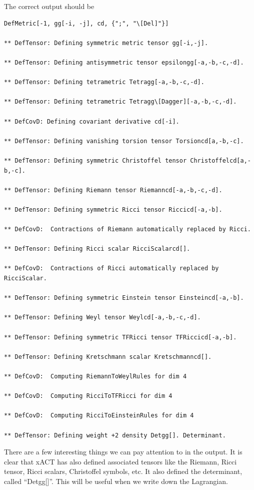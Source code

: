 \documentclass{book}
\theoremstyle{definition}
\begin{document}
The correct output should be
\begin{lstlisting}
DefMetric[-1, gg[-i, -j], cd, {";", "\[Del]"}]

** DefTensor: Defining symmetric metric tensor gg[-i,-j]. 

** DefTensor: Defining antisymmetric tensor epsilongg[-a,-b,-c,-d]. 

** DefTensor: Defining tetrametric Tetragg[-a,-b,-c,-d]. 

** DefTensor: Defining tetrametric Tetragg\[Dagger][-a,-b,-c,-d]. 

** DefCovD: Defining covariant derivative cd[-i]. 

** DefTensor: Defining vanishing torsion tensor Torsioncd[a,-b,-c]. 

** DefTensor: Defining symmetric Christoffel tensor Christoffelcd[a,-b,-c]. 

** DefTensor: Defining Riemann tensor Riemanncd[-a,-b,-c,-d]. 

** DefTensor: Defining symmetric Ricci tensor Riccicd[-a,-b]. 

** DefCovD:  Contractions of Riemann automatically replaced by Ricci.

** DefTensor: Defining Ricci scalar RicciScalarcd[]. 

** DefCovD:  Contractions of Ricci automatically replaced by RicciScalar.

** DefTensor: Defining symmetric Einstein tensor Einsteincd[-a,-b]. 

** DefTensor: Defining Weyl tensor Weylcd[-a,-b,-c,-d]. 

** DefTensor: Defining symmetric TFRicci tensor TFRiccicd[-a,-b]. 

** DefTensor: Defining Kretschmann scalar Kretschmanncd[]. 

** DefCovD:  Computing RiemannToWeylRules for dim 4

** DefCovD:  Computing RicciToTFRicci for dim 4

** DefCovD:  Computing RicciToEinsteinRules for dim 4

** DefTensor: Defining weight +2 density Detgg[]. Determinant.
\end{lstlisting}



There are a few interesting things we can pay attention to in the output. It is clear that xACT has also defined associated tensors like the Riemann, Ricci tensor, Ricci scalars, Christoffel symbols, etc. It also defined the determinant, called ``Detgg[]''. This will be useful when we write down the Lagrangian.\\
\end{document}
